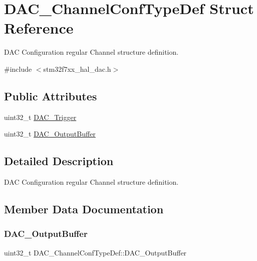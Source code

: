 \hypertarget{struct_d_a_c___channel_conf_type_def}{}\section{D\+A\+C\+\_\+\+Channel\+Conf\+Type\+Def Struct Reference}
\label{struct_d_a_c___channel_conf_type_def}


D\+AC Configuration regular Channel structure definition.  




{\ttfamily \#include $<$stm32f7xx\+\_\+hal\+\_\+dac.\+h$>$}

\subsection*{Public Attributes}
\begin{DoxyCompactItemize}
\item 
uint32\+\_\+t \mbox{\hyperlink{struct_d_a_c___channel_conf_type_def_afe5fa571464a45c9e1cc3315ad8afd83}{D\+A\+C\+\_\+\+Trigger}}
\item 
uint32\+\_\+t \mbox{\hyperlink{struct_d_a_c___channel_conf_type_def_ac60479c6788d3c4c527ff3e719516c91}{D\+A\+C\+\_\+\+Output\+Buffer}}
\end{DoxyCompactItemize}


\subsection{Detailed Description}
D\+AC Configuration regular Channel structure definition. 

\subsection{Member Data Documentation}
\mbox{\label{struct_d_a_c___channel_conf_type_def_ac60479c6788d3c4c527ff3e719516c91}} 
\subsubsection{\texorpdfstring{DAC\_OutputBuffer}{DAC\_OutputBuffer}}
{\footnotesize\ttfamily uint32\+\_\+t D\+A\+C\+\_\+\+Channel\+Conf\+Type\+Def\+::\+D\+A\+C\+\_\+\+Output\+Buffer}


